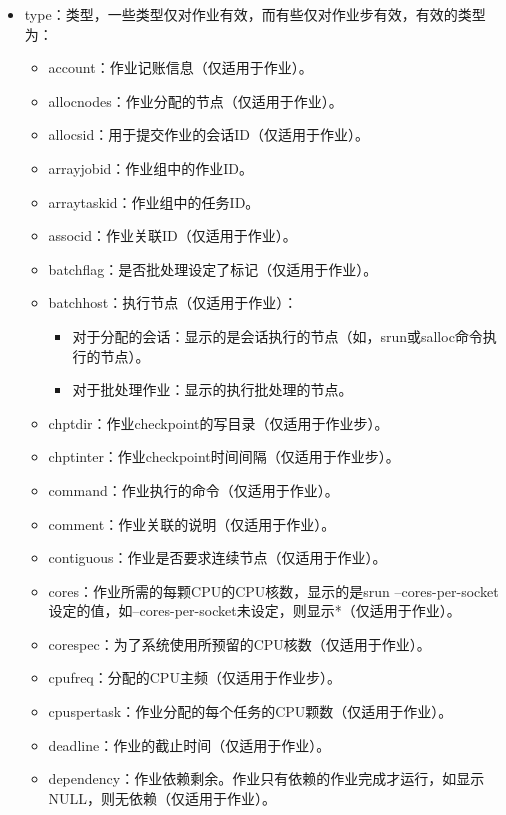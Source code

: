 \begin{itemize}
\begin{itemize}
	\item type：类型，一些类型仅对作业有效，而有些仅对作业步有效，有效的类型为：
\begin{itemize}
	\item account：作业记账信息（仅适用于作业）。
    \item allocnodes：作业分配的节点（仅适用于作业）。
    \item allocsid：用于提交作业的会话ID（仅适用于作业）。
    \item arrayjobid：作业组中的作业ID。
    \item arraytaskid：作业组中的任务ID。
    \item associd：作业关联ID（仅适用于作业）。
    \item batchflag：是否批处理设定了标记（仅适用于作业）。
    \item batchhost：执行节点（仅适用于作业）：
\begin{itemize}
	\item 对于分配的会话：显示的是会话执行的节点（如，srun或salloc命令执行的节点）。
	\item 对于批处理作业：显示的执行批处理的节点。
\end{itemize}
    \item chptdir：作业checkpoint的写目录（仅适用于作业步）。
    \item chptinter：作业checkpoint时间间隔（仅适用于作业步）。
    \item command：作业执行的命令（仅适用于作业）。
    \item comment：作业关联的说明（仅适用于作业）。
    \item contiguous：作业是否要求连续节点（仅适用于作业）。
    \item cores：作业所需的每颗CPU的CPU核数，显示的是srun --cores-per-socket设定的值，如--cores-per-socket未设定，则显示*（仅适用于作业）。
    \item corespec：为了系统使用所预留的CPU核数（仅适用于作业）。
    \item cpufreq：分配的CPU主频（仅适用于作业步）。
    \item cpuspertask：作业分配的每个任务的CPU颗数（仅适用于作业）。
    \item deadline：作业的截止时间（仅适用于作业）。
    \item dependency：作业依赖剩余。作业只有依赖的作业完成才运行，如显示NULL，则无依赖（仅适用于作业）。

\end{itemize}
\end{itemize}
\end{itemize}
